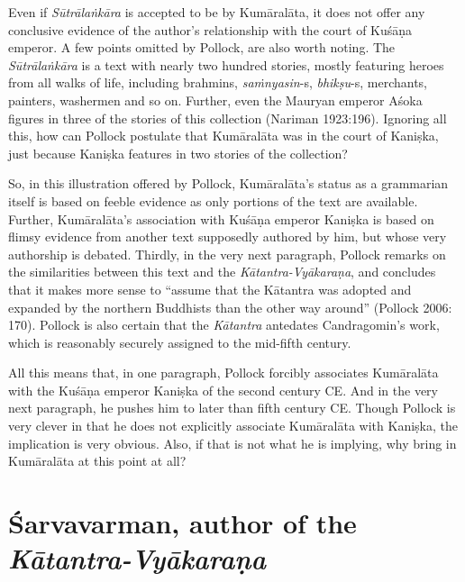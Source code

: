 \newpage

Even if {\sl Sūtrālaṅkāra} is accepted to be by Kumāralāta, it does not offer any conclusive evidence of the author's relationship with the court of Kuśāṇa emperor. A few points omitted by Pollock, are also worth noting. The {\sl Sūtrālaṅkāra} is a text with nearly two hundred stories, mostly featuring heroes from all walks of life, including brahmins, {\sl saṁnyasin}-s, {\sl bhikṣu}-s, merchants, painters, washermen and so on. Further, even the Mauryan emperor Aśoka figures in three of the stories of this collection (Nariman 1923:196). Ignoring all this, how can Pollock postulate that Kumāralāta was in the court of Kaniṣka, just because Kaniṣka features in two stories of the collection?

So, in this illustration offered by Pollock, Kumāralāta's status as a grammarian itself is based on feeble evidence as only portions of the text are available. Further, Kumāralāta's association with Kuśāṇa emperor Kaniṣka is based on flimsy evidence from another text supposedly authored by him, but whose very authorship is debated. Thirdly, in the very next paragraph, Pollock remarks on the similarities between this text and the {\sl Kātantra-Vyākaraṇa}, and concludes that it makes more sense to ``assume that the Kātantra was adopted and expanded by the northern Buddhists than the other way around'' (Pollock 2006: 170). Pollock is also certain that the {\sl Kātantra} antedates Candragomin's work, which is reasonably securely assigned to the mid-fifth century. 

All this means that, in one paragraph, Pollock forcibly associates Kumāralāta with the Kuśāṇa emperor Kaniṣka of the second century CE. And in the very next paragraph, he pushes him to later than fifth century CE. Though Pollock is very clever in that he does not explicitly associate Kumāralāta with Kaniṣka, the implication is very obvious. Also, if that is not what he is implying, why bring in Kumāralāta at this point at all?

\section{Śarvavarman, author of the {\sl\bfseries Kātantra-Vyākaraṇa}}\label{chap3-sec11}

